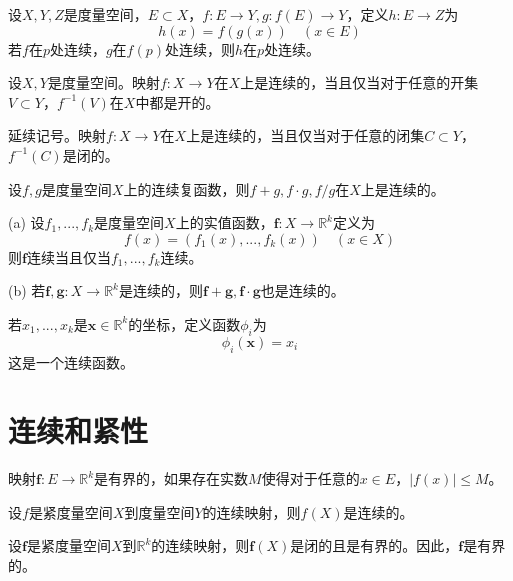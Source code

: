 \documentclass{article}
\newcommand{\ra}{\rightarrow}
\newcommand{\RR}{\mathbb{R}}
\begin{document}
\begin{theorem}
    设\(X,Y,Z\)是度量空间，\(E\subset X\)，\(f:E\ra Y,g:f(E)\ra Y\)，定义\(h:E\ra Z\)为\[
    h(x)=f(g(x))\quad(x\in E)
    \] 
    若\(f\)在\(p\)处连续，\(g\)在\(f(p)\)处连续，则\(h\)在\(p\)处连续。
\end{theorem}

\begin{theorem}
    设\(X,Y\)是度量空间。映射\(f:X\ra Y\)在\(X\)上是连续的，当且仅当对于任意的开集\(V\subset Y\)，\(f^{-1}(V)\)在\(X\)中都是开的。
\end{theorem}

\begin{corollary}
    延续记号。映射\(f:X\ra Y\)在\(X\)上是连续的，当且仅当对于任意的闭集\(C\subset Y\)，\(f^{-1}(C)\)是闭的。
\end{corollary}


\begin{theorem}
    设\(f,g\)是度量空间\(X\)上的连续复函数，则\(f+g,f\cdot g,f/g\)在\(X\)上是连续的。
\end{theorem}


\begin{theorem}
    (a) 设\(f_1,...,f_k\)是度量空间\(X\)上的实值函数，\(\bm f:X\ra \RR^k\)定义为\[
    f(x) =(f_1(x),...,f_k(x))\quad(x\in X)
    \] 则\(\bm f\)连续当且仅当\(f_1,...,f_k\)连续。

    (b) 若\(\bm{f,g}:X\ra \RR^k\)是连续的，则\(\bm{f+g,f\cdot g}\)也是连续的。
\end{theorem}

\begin{example}
        若\(x_1,...,x_k\)是\(\bm x \in \RR^k\)的坐标，定义函数\(\phi_i\)为\[
    \phi_i(\bm x) =x_i 
    \]这是一个连续函数。
\end{example}
\section{连续和紧性}
\begin{definition}
    映射\(\bm f:E \ra \RR^k\)是有界的，如果存在实数\(M\)使得对于任意的\(x\in E\)，\(|f(x)|\leq M\)。
\end{definition}

\begin{theorem}
    设\(f\)是紧度量空间\(X\)到度量空间\(Y\)的连续映射，则\(f(X)\)是连续的。
\end{theorem}

\begin{theorem}
    设\(\bm f\)是紧度量空间\(X\)到\(\RR^k\)的连续映射，则\(\bm f(X)\)是闭的且是有界的。因此，\(\bm f\)是有界的。
\end{theorem}
\end{document}
